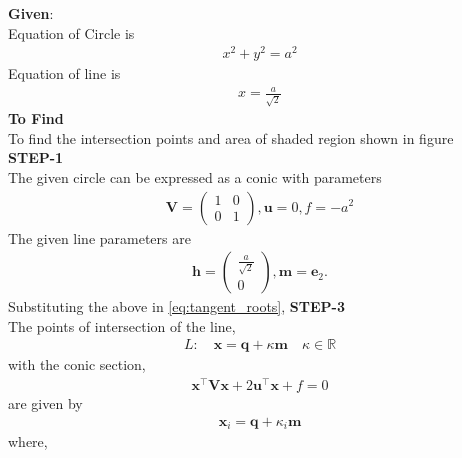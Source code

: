 \documentclass[10pt,a4paper]{report}
\newcommand{\myvec}[1]{\ensuremath{\begin{pmatrix}#1\end{pmatrix}}}
\let\vec\mathbf
\let\vec\mathbf
\begin{document}
\begin{multicols}{2}
\raggedright \textbf{Given}:\vspace{2mm}\\
Equation of Circle is \\\vspace{1mm}
\begin{align}
x^2+y^2=a^2
\end{align}
Equation of line is \\ \vspace{1mm}
\begin{align}
x=\frac{a}{\sqrt{2}}
\end{align}
\textbf{To Find }\vspace{2mm}\\
To find the intersection points and area of shaded region shown in figure\vspace{2mm}  \\ 
\textbf{STEP-1}\vspace{2mm}\\
\fi
The given circle can be expressed as a conic with parameters
\begin{align}
\vec{V}=
\myvec{
1 & 0\\
0 & 1
},
\vec{u}=0,
f=-a^2
\end{align} 
The given line 
parameters are
\begin{align} 
	\vec{h}=\myvec{\frac{a}{\sqrt{2}} \\ 0},  \vec{m}=\vec{e}_2.
\end{align}
Substituting the above in
\eqref{eq:tangent_roots},
\iffalse
\textbf{STEP-3}\vspace{2mm}\\
The points of intersection of the line, \\ 
\begin{align}
L: \quad \vec{x} = \vec{q} + \kappa \vec{m} \quad \kappa \in \mathbb{R}
\end{align}
with the conic section, \\ 
\begin{align}
	\vec{x}^{\top}\vec{V}\vec{x} + 2\vec{u}^{\top} \vec{x} + f = 0
\end{align}
are given by \\
\begin{align}
\vec{x}_i = \vec{q} + \kappa_i \vec{m}
\end{align}
where, \\
{\tiny
\begin{multline}

\end{multline}}
\end{multicols}
\end{document}
